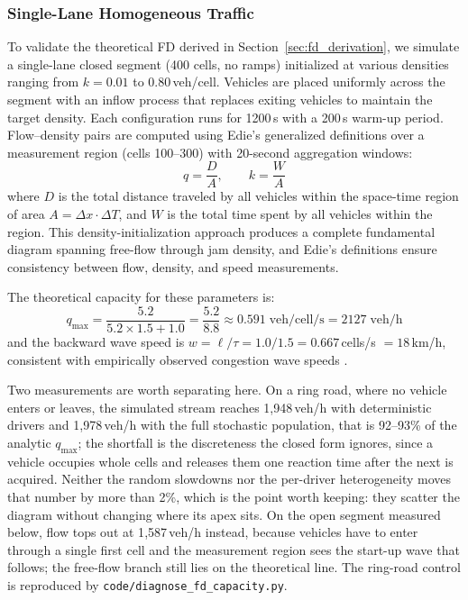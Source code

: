 \documentclass[review,authoryear]{elsarticle}
\begin{document}
\subsubsection{Single-Lane Homogeneous Traffic}

To validate the theoretical FD derived in Section~\ref{sec:fd_derivation}, we simulate a single-lane closed segment (400 cells, no ramps) initialized at various densities ranging from $k = 0.01$ to $0.80$\,veh/cell. Vehicles are placed uniformly across the segment with an inflow process that replaces exiting vehicles to maintain the target density. Each configuration runs for 1200\,s with a 200\,s warm-up period. Flow--density pairs are computed using Edie's generalized definitions \citep{edie1963discussion} over a measurement region (cells 100--300) with 20-second aggregation windows:
\begin{equation}
    q = \frac{D}{A}, \qquad k = \frac{W}{A}
    \label{eq:fd_measurement}
\end{equation}
where $D$ is the total distance traveled by all vehicles within the space-time region of area $A = \Delta x \cdot \Delta T$, and $W$ is the total time spent by all vehicles within the region. This density-initialization approach produces a complete fundamental diagram spanning free-flow through jam density, and Edie's definitions ensure consistency between flow, density, and speed measurements.

The theoretical capacity for these parameters is:
\begin{equation}
    q_{\max} = \frac{5.2}{5.2 \times 1.5 + 1.0} = \frac{5.2}{8.8} \approx 0.591\;\text{veh/cell/s} = 2127\;\text{veh/h}
\end{equation}
and the backward wave speed is $w = \ell/\tau = 1.0/1.5 = 0.667$\,cells/s $= 18$\,km/h, consistent with empirically observed congestion wave speeds \citep{cassidy1998bivariate}.

Two measurements are worth separating here. On a ring road, where no vehicle enters or leaves, the simulated stream reaches 1{,}948\,veh/h with deterministic drivers and 1{,}978\,veh/h with the full stochastic population, that is 92--93\% of the analytic $q_{\max}$; the shortfall is the discreteness the closed form ignores, since a vehicle occupies whole cells and releases them one reaction time after the next is acquired. Neither the random slowdowns nor the per-driver heterogeneity moves that number by more than 2\%, which is the point worth keeping: they scatter the diagram without changing where its apex sits. On the open segment measured below, flow tops out at 1{,}587\,veh/h instead, because vehicles have to enter through a single first cell and the measurement region sees the start-up wave that follows; the free-flow branch still lies on the theoretical line. The ring-road control is reproduced by \texttt{code/diagnose\_fd\_capacity.py}.
\end{document}
